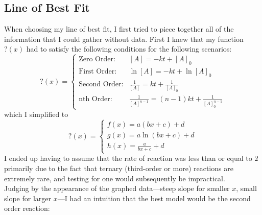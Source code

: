 \documentclass[a4paper]{article}
\begin{document}
        \subsection{Line of Best Fit}
            \begin{center}
                When choosing my line of best fit, I first tried to piece together all of
                the information that I could gather without data. First I knew that my function
                $?(x)$ had to satisfy the following conditions for the following scenarios:
                \begin{equation}
                    ?(x) = \left\{
                        \begin{array}{lr}
                            \text{Zero Order:} & [A]=-kt+[A]_0 \\
                            \text{First Order:} & \ln{[A]}=-kt+\ln{[A]_0} \\
                            \text{Second Order:} & \frac{1}{[A]}=kt+\frac{1}{[A]_0} \\
                            \text{nth Order:} & \frac{1}{[A]^{n-1}}=(n-1)kt+\frac{1}{[A]_0^{n-1}}
                        \end{array}
                    \right.
                \end{equation}
                which I simplified to
                \begin{equation}
                    ?(x) = \left\{
                        \begin{array}{l}
                            f(x)=a(bx+c)+d \\
                            g(x)=a\ln(bx+c)+d \\
                            h(x)=\frac{a}{bx+c}+d
                        \end{array}
                    \right.
                \end{equation}
                I ended up having to assume that the rate of reaction was less than or
                equal to $2$ primarily due to the fact that ternary (third-order or more)
                reactions are extremely rare, and testing for one would subsequently be
                impractical.
                \\
                Judging by the appearance of the graphed data---steep slope for smaller
                $x$, small slope for larger $x$---I had an intuition that the best model
                would be the second order reaction:
                \begin{equation}

\end{equation}
\end{center}
\end{document}
